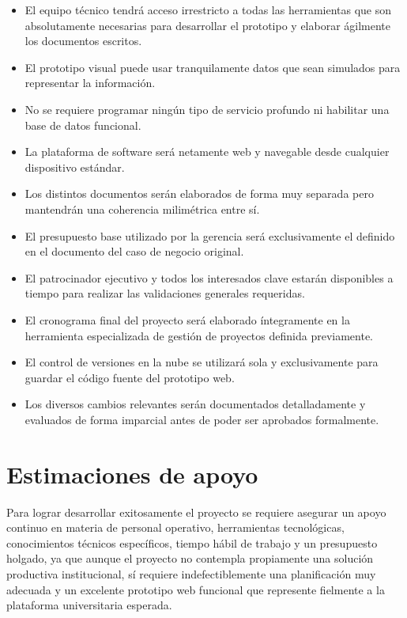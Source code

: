 \documentclass[11pt,spanish]{article}
\begin{document}
\begin{itemize}
    \item El equipo técnico tendrá acceso irrestricto a todas las herramientas que son absolutamente necesarias para desarrollar el prototipo y elaborar ágilmente los documentos escritos.
    \item El prototipo visual puede usar tranquilamente datos que sean simulados para representar la información.
    \item No se requiere programar ningún tipo de servicio profundo ni habilitar una base de datos funcional.
    \item La plataforma de software será netamente web y navegable desde cualquier dispositivo estándar.
    \item Los distintos documentos serán elaborados de forma muy separada pero mantendrán una coherencia milimétrica entre sí.
    \item El presupuesto base utilizado por la gerencia será exclusivamente el definido en el documento del caso de negocio original.
    \item El patrocinador ejecutivo y todos los interesados clave estarán disponibles a tiempo para realizar las validaciones generales requeridas.
    \item El cronograma final del proyecto será elaborado íntegramente en la herramienta especializada de gestión de proyectos definida previamente.
    \item El control de versiones en la nube se utilizará sola y exclusivamente para guardar el código fuente del prototipo web.
    \item Los diversos cambios relevantes serán documentados detalladamente y evaluados de forma imparcial antes de poder ser aprobados formalmente.
\end{itemize}

\section{Estimaciones de apoyo}

Para lograr desarrollar exitosamente el proyecto se requiere asegurar un apoyo continuo en materia de personal operativo, herramientas tecnológicas, conocimientos técnicos específicos, tiempo hábil de trabajo y un presupuesto holgado, ya que aunque el proyecto no contempla propiamente una solución productiva institucional, sí requiere indefectiblemente una planificación muy adecuada y un excelente prototipo web funcional que represente fielmente a la plataforma universitaria esperada.
\end{document}
